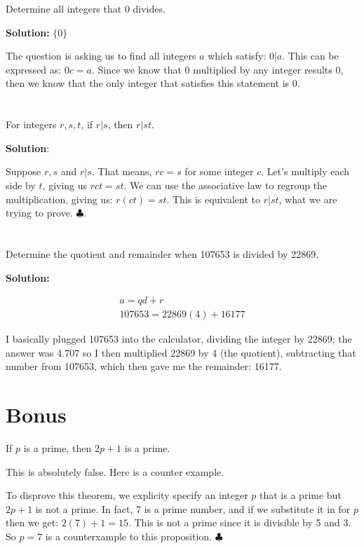 \documentclass{article}
\begin{document}
Determine all integers that 0 divides.

\textbf{Solution:} $\{0\}$

The question is asking us to find all integers $a$ which satisfy: $0|a$. This can be expressed as: $0c = a$. Since we know that $0$ multiplied by any integer results $0$, then we know that the only integer that satisfies this statement is $0$.

\section{}

For integers $r, s, t$, if $r|s$, then $r|st$.



\textbf{Solution}:

Suppose $r, s$ and $r|s$. That means, $rc=s$ for some integer $c$. Let's multiply each side by $t$, giving us $rct = st$.  We can use the associative law to regroup the multiplication, giving us: $r(ct) = st$. This is equivalent to $r|st$, what we are trying to prove. $\clubsuit$.

\section{}

Determine the quotient and remainder when 107653 is divided by 22869.

\textbf{Solution:}

\begin{align*} 
a = qd + r \\
107653 = 22869(4) + 16177
\end{align*}

I basically plugged 107653 into the calculator, dividing the integer by 22869; the answer was 4.707 so I then multiplied 22869 by 4 (the quotient), subtracting that number from 107653, which then gave me the remainder: 16177.

\section{Bonus}

If $p$ is a prime, then $2p + 1$ is a prime.

This is absolutely false. Here is a counter example.

To disprove this theorem, we explicity specify an integer $p$ that is a prime but $2p + 1$ is not a prime.  In fact, 7 is a prime number, and if we substitute it in for $p$ then we get: $2(7) + 1 = 15$. This is not a prime since it is divisible by 5 and 3. So $p=7$ is a counterxample to this proposition. $\clubsuit$
\end{document}
